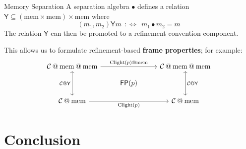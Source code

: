 \documentclass[aspectratio=1610,mathserif]{beamer}
\newcommand{\kw}[1]{\ensuremath{ \mathrm{#1} }}
\begin{document}
\begin{frame}[fragile]{Memory Separation} %
  A separation algebra $\bullet$ defines a relation
  $\mathsf{Y} \subseteq (\kw{mem} \times \kw{mem}) \times \kw{mem}$
  where
  \[
    (m_1, m_2) \mathrel{\mathsf{Y}} m \:\: :\Leftrightarrow \:\:
    m_1 \bullet m_2 = m
  \]
  The relation $\mathsf{Y}$ can then be promoted
  to a refinement convention component.

  \pause \vfill
  This allows us to formulate refinement-based \textbf{frame properties};
  for example:
  \[
    \begin{tikzcd}[row sep=small]
      \mathcal{C} \mathbin@ \kw{mem} \mathbin@ \kw{mem}
        \ar[rr, "\kw{Clight}(p) \mathbin@ \kw{mem}"]
        \ar[dd, "\mathcal{C} \mathbin@ \mathsf{Y}"', leftrightarrow] &&
      \mathcal{C} \mathbin@ \kw{mem} \mathbin@ \kw{mem}
        \ar[dd, "\mathcal{C} \mathbin@ \mathsf{Y}", leftrightarrow]
      \\
      & \mathsf{FP}(p) &
      \\
      \mathcal{C} \mathbin@ \kw{mem}
        \ar[rr, "\kw{Clight}(p)"'] &&
      \mathcal{C} \mathbin@ \kw{mem}
    \end{tikzcd}
  \]
\end{frame}

\section{Conclusion}
\end{document}
